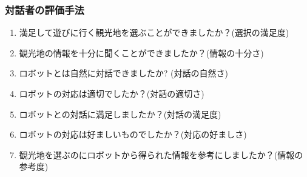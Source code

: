 \subsubsection{対話者の評価手法}
\begin{enumerate}
    \item 満足して遊びに行く観光地を選ぶことができましたか？(選択の満足度)
    \item 観光地の情報を十分に聞くことができましたか？(情報の十分さ)
    \item ロボットとは自然に対話できましたか? (対話の自然さ)
    \item ロボットの対応は適切でしたか？(対話の適切さ)
    \item ロボットとの対話に満足しましたか？(対話の満足度)
    \item ロボットの対応は好ましいものでしたか？(対応の好ましさ)
    \item 観光地を選ぶのにロボットから得られた情報を参考にしましたか？(情報の参考度)
\end{enumerate}

